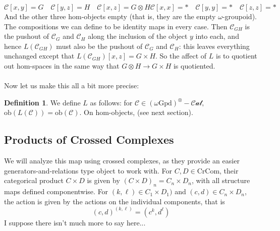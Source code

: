 \documentclass[12pt]{article}
\theoremstyle{definition}
\newtheorem{definition}[theorem]{Definition}
\newcommand{\C}{\mathcal{C}}
\newcommand{\stinfty}{\omega\text{Gpd}}
\newcommand{\crcom}{\text{CrCom}}
\newcommand{\graycatzero}{(\stinfty)^\otimes-\mathcal{Cat}}
\newcommand{\ob}{\text{ob}}
\newcommand{\forcecartesian}{L}
\begin{document}
		$$\C[x,y] = G \quad \C[y,z] = H \quad \C[x,z] = G \otimes H \C[x,x] = * \quad \C[y,y] = * \quad \C[z,z] = *$$
		And the other three hom-objects empty (that is, they are the empty $\omega$-groupoid). The compositions we can define to be identity maps in every case. Then $\C_{GH}$ is the pushout of $\C_G$ and $\C_H$ along the inclusion of the object $y$ into each, and hence $\forcecartesian(\C_{GH})$ must also be the pushout of $\C_G$ and $\C_H$: this leaves everything unchanged except that $\forcecartesian(\C_{GH})[x,z] = G \times H$. 
		So the affect of $\forcecartesian$ is to quotient out hom-spaces in the same way that $G \otimes H \to G \times H$ is quotiented. 
		\\\\
		Now let us make this all a bit more precise:
		\begin{definition}
			We define $\forcecartesian$ as follows: for $\C \in \graycatzero,$ $\ob(\forcecartesian(\C)) = \ob(\C)$. On hom-objects, (see next section).
		\end{definition}
\subsection{Products of Crossed Complexes}
		We will analyze this map using crossed complexes, as they provide an easier generators-and-relations type object to work with. For $C,D \in \crcom$, their categorical product $C \times D$ is given by $(C \times D)_n = C_n \times D_n$, with all structure maps defined componentwise. For $(k,\ell) \in C_1 \times D_1)$ and $(c,d) \in C_n \times D_n$, the action is given by the actions on the individual components, that is
	$$(c,d)^{(k,\ell)} = (c^k,d^\ell)$$
I suppose there isn't much more to say here...
\end{document}
